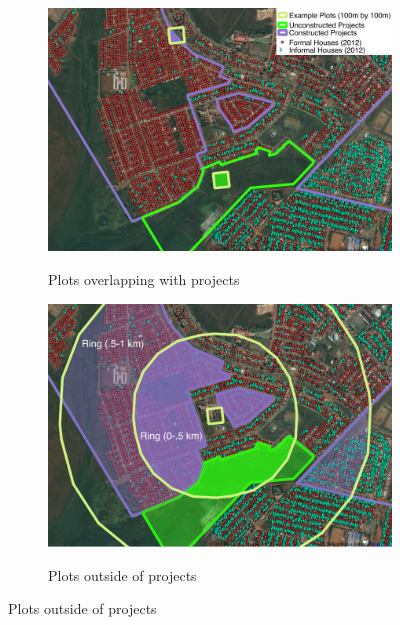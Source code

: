 \documentclass[12pt]{article}
\begin{document}
\begin{figure}[hbtp]
    \caption{Measuring Spatial Exposure to \\ Example Housing Projects}
    \label{fig:spatialexposure}
    \centering
    \vspace{2mm}
    \begin{subfigure}[b]{.8\textwidth}
        \centering
        \caption[]{\small Plots overlapping with projects}  
        \vspace{-1mm}
        \includegraphics[width=\textwidth,trim={.2cm .2cm .2cm 0cm}, clip=true]{figures/exp_3_small_legend_75.png}
        \label{fig:insideproj}
    \end{subfigure}
    \vskip 1mm \vskip 0pt
    \begin{subfigure}[b]{.8\textwidth}  
        \centering 
        \caption[]{\small Plots outside of projects}
        \vspace{-1mm}
        \includegraphics[width=\textwidth,trim={.2cm .2cm .2cm 0cm}, clip=true]{figures/exp_2_ring_75.png}
        \label{fig:outsideproj}
    \end{subfigure}
\end{figure} 
\end{document}
